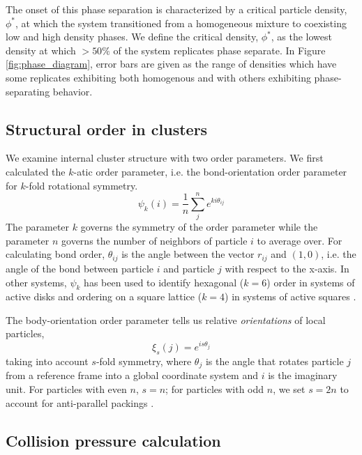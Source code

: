 The onset of this phase separation is characterized by a critical particle density, $\phi^*$, at which the system transitioned from a homogeneous mixture to coexisting low and high density phases.
We define the critical density, $\phi^*$, as the lowest density at which $>50\%$ of the system replicates phase separate.
In Figure \ref{fig:phase_diagram}, error bars are given as the range of densities which have some replicates exhibiting both homogenous and with others exhibiting phase-separating behavior.


\subsection{Structural order in clusters}
\label{sec:order}

We examine internal cluster structure with two order parameters.
We first calculated the $k$-atic order parameter, i.e. the bond-orientation order parameter for $k$-fold rotational symmetry.
\begin{equation}
\psi_k(i) = \frac{1}{n} \sum_j^n e^{ki\theta_{ij}}
\end{equation}
The parameter $k$ governs the symmetry of the order parameter while the parameter $n$ governs the number of neighbors of particle $i$ to average over.
For calculating bond order, $\theta_{ij}$ is the angle between the vector $r_{ij}$ and $(1,0)$, i.e. the angle of the bond between particle $i$ and particle $j$ with respect to the x-axis.
In other systems, $\psi_k$ has been used to identify hexagonal ($k=6$) order in systems of active disks \cite{Redner_2013_PRL} and ordering on a square lattice ($k=4$) in systems of active squares \cite{Prymidis_2016_SoftMatter}.

The body-orientation order parameter tells us relative \textit{orientations} of local particles,
\begin{equation}
\xi_s(j)=e^{{i}s\theta_j}
\end{equation}
taking into account $s$-fold symmetry, where $\theta_j$ is the angle that rotates particle $j$ from a reference frame into a global coordinate system and $i$ is the imaginary unit.
For particles with even $n$, $s=n$; for particles with odd $n$, we set $s=2n$ to account for anti-parallel packings \cite{Atkinson_2012_PRE}.


\subsection{Collision pressure calculation}
\label{sec:collision-pressure}

